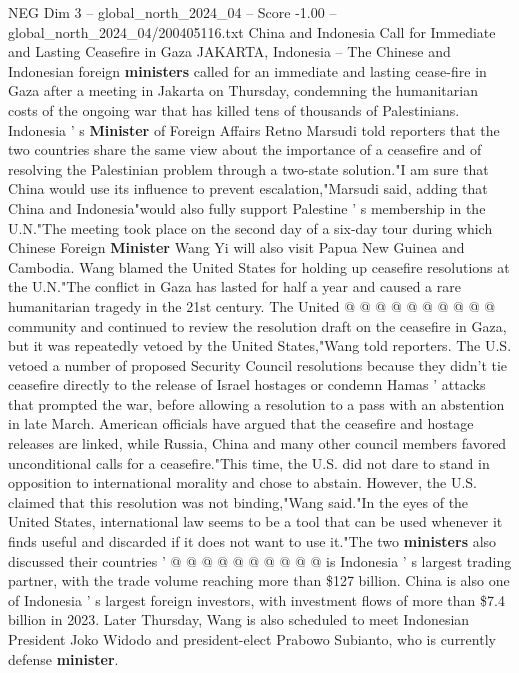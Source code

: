 \begin{textsample}{NEG Dim 3 – global\_north\_2024\_04 – Score -1.00 – global\_north\_2024\_04/200405116.txt}  \label{ex:f3_neg_382}
China and Indonesia Call for Immediate and Lasting Ceasefire in Gaza JAKARTA, Indonesia -- The Chinese and Indonesian foreign \textbf{ministers} called for an immediate and lasting cease-fire in Gaza after a meeting in Jakarta on Thursday, condemning the humanitarian costs of the ongoing war that has killed tens of thousands of Palestinians.
Indonesia ' s \textbf{Minister} of Foreign Affairs Retno Marsudi told reporters that the two countries share the same view about the importance of a ceasefire and of resolving the Palestinian problem through a two-state solution."I am sure that China would use its influence to prevent escalation,"Marsudi said, adding that China and Indonesia"would also fully support Palestine ' s membership in the U.N."The meeting took place on the second day of a six-day tour during which Chinese Foreign \textbf{Minister} Wang Yi will also visit Papua New Guinea and Cambodia.
Wang blamed the United States for holding up ceasefire resolutions at the U.N."The conflict in Gaza has lasted for half a year and caused a rare humanitarian tragedy in the 21st century.
The United @ @ @ @ @ @ @ @ @ @ community and continued to review the resolution draft on the ceasefire in Gaza, but it was repeatedly vetoed by the United States,"Wang told reporters.
The U.S. vetoed a number of proposed Security Council resolutions because they didn't tie ceasefire directly to the release of Israel hostages or condemn Hamas ' attacks that prompted the war, before allowing a resolution to a pass with an abstention in late March.
American officials have argued that the ceasefire and hostage releases are linked, while Russia, China and many other council members favored unconditional calls for a ceasefire."This time, the U.S. did not dare to stand in opposition to international morality and chose to abstain.
However, the U.S. claimed that this resolution was not binding,"Wang said."In the eyes of the United States, international law seems to be a tool that can be used whenever it finds useful and discarded if it does not want to use it."The two \textbf{ministers} also discussed their countries ' @ @ @ @ @ @ @ @ @ @ is Indonesia ' s largest trading partner, with the trade volume reaching more than \$127 billion.
China is also one of Indonesia ' s largest foreign investors, with investment flows of more than \$7.4 billion in 2023.
Later Thursday, Wang is also scheduled to meet Indonesian President Joko Widodo and president-elect Prabowo Subianto, who is currently defense \textbf{minister}.

\end{textsample}
